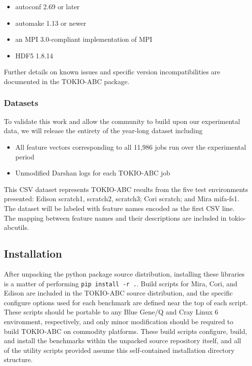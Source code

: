 \begin{itemize}
\item autoconf 2.69 or later
\item automake 1.13 or newer
\item an MPI 3.0-compliant implementation of MPI
\item HDF5 1.8.14
\end{itemize}

Further details on known issues and specific version incompatibilities are documented in the TOKIO-ABC package.

\subsubsection{Datasets}

To validate this work and allow the community to build upon our experimental data, we will release the entirety of the year-long dataset including

\begin{itemize}
\item All feature vectors corresponding to all 11,986 jobs run over the experimental period
\item Unmodified Darshan logs for each TOKIO-ABC job
\end{itemize}

This CSV dataset represents TOKIO-ABC results from the five test environments presented:
Edison scratch1, scratch2, scratch3; Cori scratch; and Mira mifa-fs1.
The dataset will be labeled with feature names encoded as the first CSV line.
The mapping between feature names and their descriptions are included in tokio-abcutils.

\subsection{Installation}

After unpacking the python package source distribution, installing these libraries is a matter of performing \texttt{{pip install -r .}}.
Build scripts for Mira, Cori, and Edison are included in the TOKIO-ABC source distribution, and the specific configure options used for each benchmark are defined near the top of each script.
These scripts should be portable to any Blue Gene/Q and Cray Linux 6 environment, respectively, and only minor modification should be required to build TOKIO-ABC on commodity platforms.
These build scripts configure, build, and install the benchmarks within the unpacked source repository itself, and all of the utility scripts provided assume this self-contained installation directory structure.

